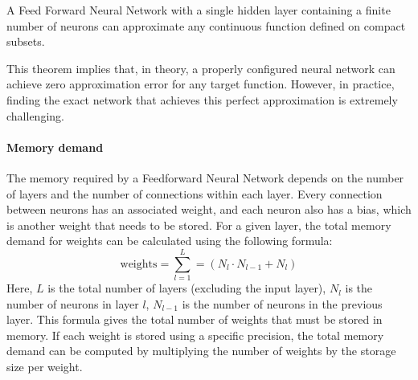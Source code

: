 \begin{theorem}
    A Feed Forward Neural Network with a single hidden layer containing a finite number of neurons can approximate any continuous function defined on compact subsets.
\end{theorem}
\noindent This theorem implies that, in theory, a properly configured neural network can achieve zero approximation error for any target function. 
However, in practice, finding the exact network that achieves this perfect approximation is extremely challenging.

\paragraph*{Memory demand}
The memory required by a Feedforward Neural Network depends on the number of layers and the number of connections within each layer. 
Every connection between neurons has an associated weight, and each neuron also has a bias, which is another weight that needs to be stored.
For a given layer, the total memory demand for weights can be calculated using the following formula:
\[\text{weights}=\sum_{l=1}^{L}=(N_l\cdot N_{l-1}+N_l)\]
Here, $L$ is the total number of layers (excluding the input layer), $N_l$ is the number of neurons in layer $l$, $N_{l-1}$ is the number of neurons in the previous layer. 
This formula gives the total number of weights that must be stored in memory. 
If each weight is stored using a specific precision, the total memory demand can be computed by multiplying the number of weights by the storage size per weight.